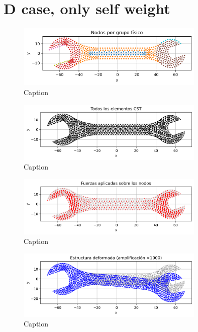 \documentclass{article}  %
\begin{document}
\section{D case, only self weight}

\begin{figure}[H]
  \centering
  \includegraphics[width=0.8\textwidth]{GRAFICOS/Case d_nodes_por_grupo.png}
  \caption{Caption}
  \label{fig:wrench}
\end{figure}

\begin{figure}[H]
  \centering
  \includegraphics[width=0.8\textwidth]{GRAFICOS/Case d_elementos.png}
  \caption{Caption}
  \label{fig:deformed_shape}
\end{figure}

\begin{figure}[H]
  \centering
  \includegraphics[width=0.8\textwidth]{GRAFICOS/Case d_fuerzas.png}
  \caption{Caption}
  \label{fig:strain}
\end{figure}

\begin{figure}[H]
  \centering
  \includegraphics[width=0.8\textwidth]{GRAFICOS/Case d_deformada.png}
  \caption{Caption}
  \label{fig:stress}
\end{figure}
\end{document}
